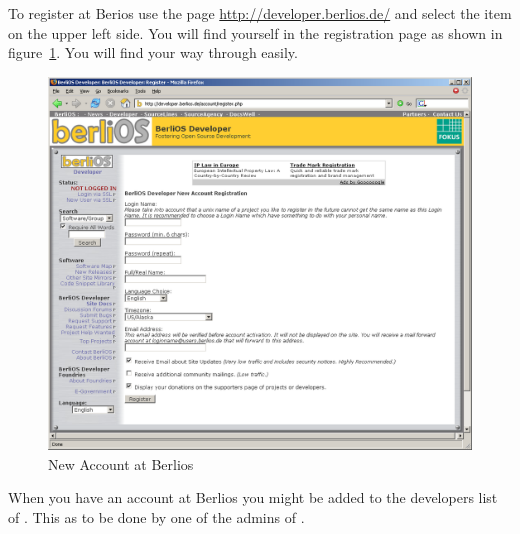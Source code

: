 To register at Berios use the page \url{http://developer.berlios.de/}
and select the item \menu{} on the upper left side. You will find
yourself in the registration page as shown in
figure~\ref{fig:berlios-register}. You will find your way through
easily.
\begin{figure}[htbp]
  \centering  \includegraphics[scale=.33]{image/berlios-register}
  \caption{New Account at Berlios}\label{fig:berlios-register}
\end{figure}

When you have an account at Berlios you might be added to the
developers list of \ExTeX. This as to be done by one of the admins of
\ExTeX.

